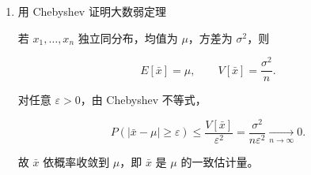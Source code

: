 \begin{question}
\begin{solution}
\begin{enumerate}
这就是 Chebyshev 不等式。

\item 用 Chebyshev 证明大数弱定理

若 \(x_1,\dots,x_n\) 独立同分布，均值为 \(\mu\)，方差为 \(\sigma^2\)，则

\[
E[\bar x]=\mu,\qquad V[\bar x]=\frac{\sigma^2}{n}.
\]

对任意 \(\varepsilon>0\)，由 Chebyshev 不等式，

\[
P(|\bar x-\mu|\ge \varepsilon)
\le \frac{V[\bar x]}{\varepsilon^2}
=\frac{\sigma^2}{n\varepsilon^2}
\xrightarrow[n\to\infty]{}0.
\]

故 \(\bar x\) 依概率收敛到 \(\mu\)，即 \(\bar x\) 是 \(\mu\)
的一致估计量。
\end{enumerate}
\end{solution}
\end{question}


